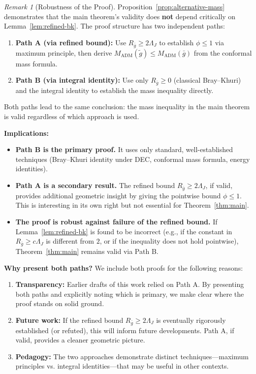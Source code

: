 \documentclass[12pt]{article}
\theoremstyle{plain}
\theoremstyle{definition}
\theoremstyle{remark}
\newtheorem{remark}[theorem]{Remark}
\newcommand{\ADM}{\mathrm{ADM}}
\newcommand{\tg}{\tilde{g}}
\newcommand{\bg}{\bar{g}}
\begin{document}
\begin{remark}[Robustness of the Proof]\label{rem:robustness}
Proposition~\ref{prop:alternative-mass} demonstrates that the main theorem's validity does \textbf{not} depend critically on Lemma~\ref{lem:refined-bk}. The proof structure has two independent paths:
\begin{enumerate}
    \item \textbf{Path A (via refined bound):} Use $R_{\bg} \geq 2\Lambda_J$ to establish $\phi \leq 1$ via maximum principle, then derive $M_{\ADM}(\tg) \leq M_{\ADM}(\bg)$ from the conformal mass formula.
    \item \textbf{Path B (via integral identity):} Use only $R_{\bg} \geq 0$ (classical Bray--Khuri) and the integral identity to establish the mass inequality directly.
\end{enumerate}
Both paths lead to the same conclusion: the mass inequality in the main theorem is valid regardless of which approach is used.

\textbf{Implications:}
\begin{itemize}
\item \textbf{Path B is the primary proof.} It uses only standard, well-established techniques (Bray--Khuri identity under DEC, conformal mass formula, energy identities).
\item \textbf{Path A is a secondary result.} The refined bound $R_{\bg} \geq 2\Lambda_J$, if valid, provides additional geometric insight by giving the pointwise bound $\phi \leq 1$. This is interesting in its own right but not essential for Theorem~\ref{thm:main}.
\item \textbf{The proof is robust against failure of the refined bound.} If Lemma~\ref{lem:refined-bk} is found to be incorrect (e.g., if the constant in $R_{\bg} \geq c\Lambda_J$ is different from $2$, or if the inequality does not hold pointwise), Theorem~\ref{thm:main} remains valid via Path B.
\end{itemize}

\textbf{Why present both paths?} We include both proofs for the following reasons:
\begin{enumerate}[label=(\roman*)]
\item \textbf{Transparency:} Earlier drafts of this work relied on Path A. By presenting both paths and explicitly noting which is primary, we make clear where the proof stands on solid ground.
\item \textbf{Future work:} If the refined bound $R_{\bg} \geq 2\Lambda_J$ is eventually rigorously established (or refuted), this will inform future developments. Path A, if valid, provides a cleaner geometric picture.
\item \textbf{Pedagogy:} The two approaches demonstrate distinct techniques---maximum principles vs. integral identities---that may be useful in other contexts.
\end{enumerate}
\end{remark}
\end{document}
